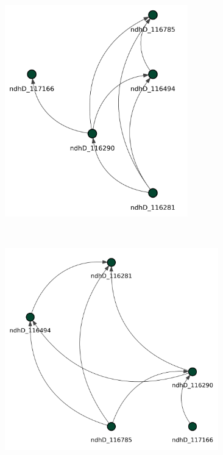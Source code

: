 \documentclass[
]{article}
\theoremstyle{definition}
\theoremstyle{remark}
\begin{document}
\begin{figure}[H]

\begin{minipage}{0.43\linewidth}

\includegraphics[width=3.125in,height=\textheight,keepaspectratio]{Figures Causal Discovery/DAG_HC_ndhD.png}

\end{minipage}%
%
\begin{minipage}{0.13\linewidth}
~\end{minipage}%
%
\begin{minipage}{0.43\linewidth}

\includegraphics[width=3.64583in,height=\textheight,keepaspectratio]{Figures Causal Discovery/DAG_PC_ndhD.png}

\end{minipage}%
\newline
\begin{minipage}{0.43\linewidth}


\end{minipage}
\end{figure}
\end{document}
